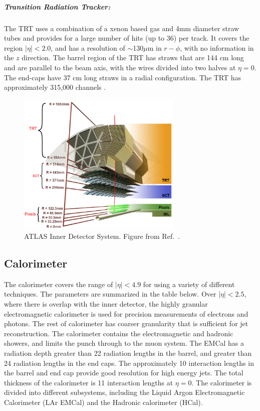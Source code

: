 \subparagraph{Transition Radiation Tracker:} The TRT uses a combination of a xenon based gas and 4mm diameter straw tubes and provides for a large number of hits (up to 36) per track.
It covers the region $|\eta| <  2.0$, and has a resolution of $\sim$130$\mu$m in $r-\phi$, with no information in the $z$ direction.
The barrel region of the TRT has straws that are 144 cm long and are parallel to the beam axis, with the wires divided into two halves at $\eta = 0$.
The end-caps have 37 cm long straws in a radial configuration.
The TRT has approximately 315,000 channels \cite{Aad:2008zzm}.


\begin{figure}[ht]
	\centering
        \includegraphics[width=0.7\textwidth]{figures/setup/inner_det.png}
          \caption{ATLAS Inner Detector System.
          Figure from Ref.~\cite{Potamianos:2209070}.}
          \label{fig:inner_det}
\end{figure}

\subsection{Calorimeter}
The calorimeter covers the range of $|\eta| < 4.9$ for using a variety of different techniques.
The parameters are summarized in the table below.
Over  $|\eta| < 2.5$, where there is overlap with the inner detector, the highly granular electromagnetic calorimeter is used for precision measurements of electrons and photons.
The rest of calorimeter has coarser granularity that is sufficient for jet reconstruction.
The calorimeter contains the electromagnetic and hadronic showers, and limits the punch through to the muon system.
The EMCal has a radiation depth greater than 22 radiation lengths in the barrel, and greater than 24 radiation lengths in the end caps.
The approximately 10 interaction lengths in the barrel and end cap provide good resolution for high energy jets.
The total thickness of the calorimeter is 11 interaction lengths at $\eta = 0$.
The calorimeter is divided into different subsystems, including the Liquid Argon Electromagnetic Calorimeter (LAr EMCal) and the Hadronic calorimeter (HCal).

